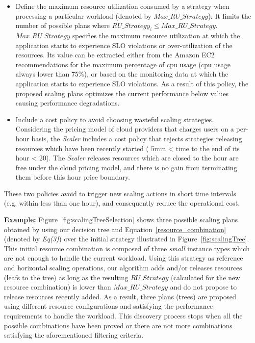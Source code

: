\begin{itemize}
\item Define the maximum resource utilization consumed  by a strategy when processing a particular workload (denoted by \emph{$Max\_RU\_Strategy$}). It limits the number of possible plans where \emph{$RU\_Strategy_{i} \leq Max\_RU\_Strategy$}. \emph{$Max\_RU\_Strategy$} specifies the maximum resource utilization at which the application starts to experience SLO violations or over-utilization of the resources. Its value can be extracted either from the Amazon EC2 recommendations for the maximum percentage of cpu usage (cpu usage always lower than 75\%), or based on the monitoring data at which the application starts to experience SLO violations. As a result of this policy, the proposed scaling plans optimizes the current performance below values causing performance degradations. 


\item Include a cost policy to avoid choosing wasteful scaling strategies. Considering the pricing model of cloud providers that charges users on a per-hour basis, the \emph{Scaler} includes a cost policy that rejects strategies releasing resources which have been recently started ( 5min < time to the end of its hour < 20). The \emph{Scaler} releases resources which are closed to the hour are free under the cloud pricing model, and there is no gain from terminating them before this hour price boundary.

\end{itemize}

These two policies avoid to trigger new scaling actions in short time intervals (e.g. within less than one hour), and consequently reduce the operational cost. 

\vspace{3mm}

\noindent\textbf{Example:} Figure~\ref{fig:scalingTreeSelection} shows three possible scaling plans obtained by using our decision tree and Equation~\ref{resource_combination} (denoted by \emph{Eq(3)}) over the initial strategy illustrated in Figure~\ref{fig:scalingTree}. This initial resource combination is composed of three \emph{small} instance types which are not enough to handle the current workload. Using this strategy as reference and horizontal scaling operations, our algorithm adds and/or releases resources (leafs to the tree) as long as the resulting \emph{$RU\_Strategy$} (calculated for the new resource combination) is lower than \emph{$Max\_RU\_Strategy$} and do not propose to release resources recently added. As a result, three plans (trees) are proposed using different resource configurations and satisfying the performance requirements to handle the workload. This discovery process stops when all the possible combinations have been proved or there are not more combinations satisfying the aforementioned filtering criteria. 



